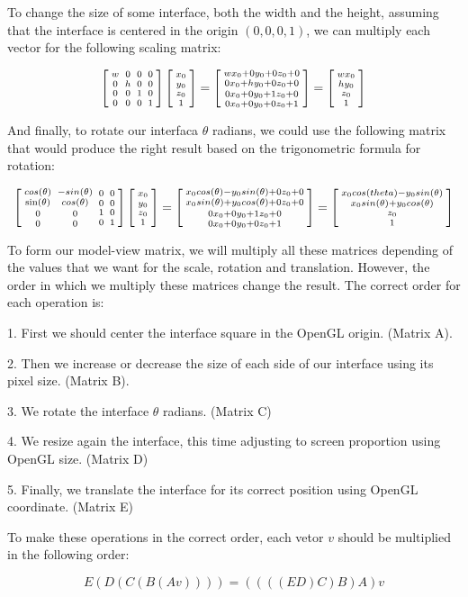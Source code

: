 To change the size of some interface, both the width and the height,
assuming that the interface is centered in the origin $(0, 0, 0, 1)$,
we can multiply each vector for the following scaling matrix:

$$ \left[{{w \atop 0}\atop {0\atop 0}}{{0 \atop h}\atop {0 \atop
      0}}{{0\atop 0}\atop{1 \atop 0}}{{0 \atop 0}\atop{0\atop
      1}}\right]\left[{{x_0\atop y_0}\atop {z_0\atop
      1}}\right]=\left[{{wx_0+0y_0+0z_0+0\atop 0x_0+hy_0+0z_0+0}\atop
    {0x_0+0y_0+1z_0+0\atop 0x_0+0y_0+0z_0+1}}\right]=\left[{{wx_0\atop
      hy_0}\atop {z_0\atop 1}}\right]
$$

And finally, to rotate our interfaca $\theta$ radians, we could use
the following matrix that would produce the right result based on the
trigonometric formula for rotation:

$$ \left[{{cos(\theta) \atop \sin(\theta)}\atop {0\atop
      0}}{{-sin(\theta) \atop cos(\theta)}\atop {0 \atop 0}}{{0\atop
      0}\atop{1 \atop 0}}{{0 \atop 0}\atop{0\atop
      1}}\right]\left[{{x_0\atop y_0}\atop {z_0\atop
      1}}\right]=\left[{{x_0 cos(\theta)-y_0 sin(\theta)+0z_0+0\atop
      x_0 sin(\theta)+y_0 cos(\theta)+0z_0+0}\atop
    {0x_0+0y_0+1z_0+0\atop 0x_0+0y_0+0z_0+1}}\right]=\left[{{x_0
      cos(theta) - y_0 sin(\theta) \atop x_0 sin(\theta) + y_0
      cos(\theta)}\atop {z_0\atop 1}}\right]
$$

To form our model-view matrix, we will multiply all these matrices
depending of the values that we want for the scale, rotation and
translation. However, the order in which we multiply these matrices
change the result. The correct order for each operation is:

1. First we should center the interface square in the OpenGL
origin. (Matrix A).

2. Then we increase or decrease the size of each side of our
interface using its pixel size. (Matrix B).

3. We rotate the interface $\theta$ radians. (Matrix C)

4. We resize again the interface, this time adjusting to screen
proportion using OpenGL size. (Matrix D)

5. Finally, we translate the interface for its correct
position using OpenGL coordinate. (Matrix E)

To make these operations in the correct order, each vetor $v$ should
be multiplied in the following order:

$$
E(D(C(B(A v)))) = ((((ED)C)B)A)v
$$

